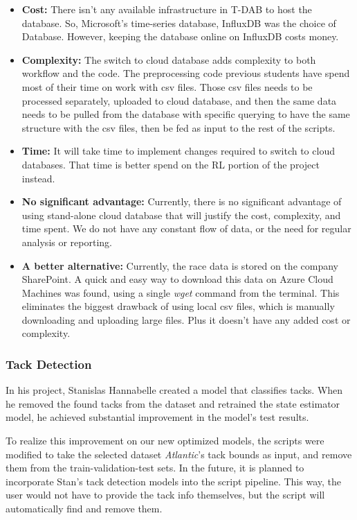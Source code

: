 \documentclass[12pt,twoside]{report}
\begin{document}
\begin{itemize}
  \item \textbf{Cost:} There isn't any available infrastructure in T-DAB to host the database. So, Microsoft's time-series database, InfluxDB was the choice of Database. However, keeping the database online on InfluxDB costs money.
  \item \textbf{Complexity:} The switch to cloud database adds complexity to both workflow and the code. The preprocessing code previous students have spend most of their time on work with csv files. Those csv files needs to be processed separately, uploaded to cloud database, and then the same data needs to be pulled from the database with specific querying to have the same structure with the csv files, then be fed as input to the rest of the scripts.
  \item \textbf{Time:} It will take time to implement changes required to switch to cloud databases. That time is better spend on the RL portion of the project instead.
  \item \textbf{No significant advantage:} Currently, there is no significant advantage of using stand-alone cloud database that will justify the cost, complexity, and time spent. We do not have any constant flow of data, or the need for regular analysis or reporting.
  \item \textbf{A better alternative:} Currently, the race data is stored on the company SharePoint. A quick and easy way to download this data on Azure Cloud Machines was found, using a single \textit{wget} command from the terminal. This eliminates the biggest drawback of using local csv files, which is manually downloading and uploading large files. Plus it doesn't have any added cost or complexity.
\end{itemize}

\subsubsection{Tack Detection}
In his project, Stanislas Hannabelle created a model that classifies tacks. When he removed the found tacks from the dataset and retrained the state estimator model, he achieved substantial improvement in the model's test results. 

To realize this improvement on our new optimized models, the scripts were modified to take the selected dataset \textit{Atlantic}'s tack bounds as input, and remove them from the train-validation-test sets. In the future, it is planned to incorporate Stan's tack detection models into the script pipeline. This way, the user would not have to provide the tack info themselves, but the script will automatically find and remove them.
\end{document}
